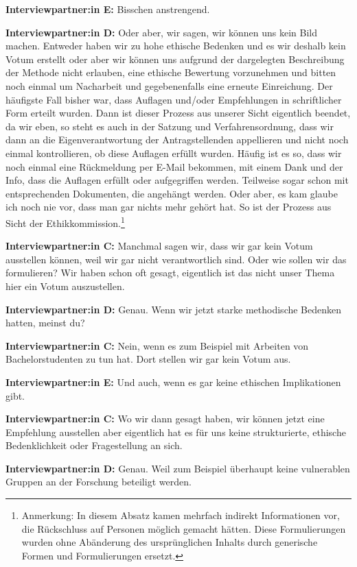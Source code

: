 \documentclass[a4paper,12pt,twoside,numbers=noendperiod]{scrreprt}
\begin{document}
\textbf{Interviewpartner:in E:} Bisschen anstrengend.

\textbf{Interviewpartner:in D:} Oder aber, wir sagen, wir können uns kein Bild machen. Entweder haben wir zu hohe ethische Bedenken und es wir deshalb kein Votum erstellt oder aber wir können uns aufgrund der dargelegten Beschreibung der Methode nicht erlauben, eine ethische Bewertung vorzunehmen und bitten noch einmal um Nacharbeit und gegebenenfalls eine erneute Einreichung. Der häufigste Fall bisher war, dass Auflagen und/oder Empfehlungen in schriftlicher Form erteilt wurden. Dann ist dieser Prozess aus unserer Sicht eigentlich beendet, da wir eben, so steht es auch in der Satzung und Verfahrensordnung, dass wir dann an die Eigenverantwortung der Antragstellenden appellieren und nicht noch einmal kontrollieren, ob diese Auflagen erfüllt wurden. Häufig ist es so, dass wir noch einmal eine Rückmeldung per E-Mail bekommen, mit einem Dank und der Info, dass die Auflagen erfüllt oder aufgegriffen werden. Teilweise sogar schon mit entsprechenden Dokumenten, die angehängt werden. Oder aber, es kam glaube ich noch nie vor, dass man gar nichts mehr gehört hat. So ist der Prozess aus Sicht der Ethikkommission.\footnote{Anmerkung: In diesem Absatz kamen mehrfach indirekt Informationen vor, die Rückschluss auf Personen möglich gemacht hätten. Diese Formulierungen wurden ohne Abänderung des ursprünglichen Inhalts durch generische Formen und Formulierungen ersetzt.}

\textbf{Interviewpartner:in C:} Manchmal sagen wir, dass wir gar kein Votum ausstellen können, weil wir gar nicht verantwortlich sind. Oder wie sollen wir das formulieren? Wir haben schon oft gesagt, eigentlich ist das nicht unser Thema hier ein Votum auszustellen.

\textbf{Interviewpartner:in D:} Genau. Wenn wir jetzt starke methodische Bedenken hatten, meinst du?

\textbf{Interviewpartner:in C:} Nein, wenn es zum Beispiel mit Arbeiten von Bachelorstudenten zu tun hat. Dort stellen wir gar kein Votum aus.

\textbf{Interviewpartner:in E:} Und auch, wenn es gar keine ethischen Implikationen gibt.

\textbf{Interviewpartner:in C:} Wo wir dann gesagt haben, wir können jetzt eine Empfehlung ausstellen aber eigentlich hat es für uns keine strukturierte, ethische Bedenklichkeit oder Fragestellung an sich.

\textbf{Interviewpartner:in D:} Genau. Weil zum Beispiel überhaupt keine vulnerablen Gruppen an der Forschung beteiligt werden.
\end{document}

